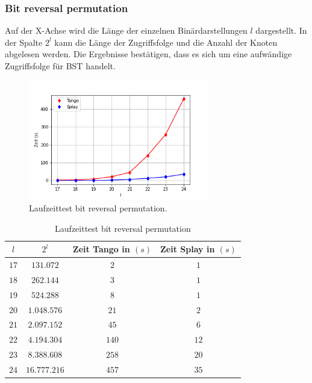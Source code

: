 \documentclass[a4paper,12pt]{article}
\begin{document}
\subsubsection{Bit reversal permutation}
Auf der X-Achse wird die Länge der einzelnen Binärdarstellungen $l$ dargestellt. In der Spalte $2^l$ kann die Länge der Zugriffsfolge und die Anzahl der Knoten abgelesen werden. Die Ergebnisse bestätigen, dass es sich um eine aufwändige Zugriffsfolge für BST handelt.
\begin{figure}[H]
	\centering
	\includegraphics[width=0.7\textwidth]{"Medien/laufzeittest/diagramm/brp"}
	\caption{Laufzeittest bit reversal permutation.}
	\label{fig:ResultGUI}
\end{figure}
\begin{table}[H]
	\begin{center}
		\begin{tabular}[c]{|c|c|c|c|}
			\hline
			$l$ & $2^l$ &Zeit Tango in $\left(s\right)$ &Zeit Splay in $\left(s\right)$ \\
			\hline
			$17$ &	$131.072 $ &$2$ &$1$ \\
			\hline
			$18$  &$262.144 $ &$3$ &$1$  \\
			\hline
			$19$  &$524.288 $ &$8$ &$1$  \\
			\hline
			$20$  &$1.048.576 $ &$21$ &$2$  \\
			\hline
			$21$  &$2.097.152 $ &$45$ &$6$  \\
			\hline
			$22$  &$4.194.304 $ &$140$ &$12$  \\
			\hline
			$23$  &$8.388.608 $ &$258$ &$20$  \\
			\hline
			$24$  &$16.777.216$ &$457$ &$35$  \\
			\hline
		\end{tabular}
		\caption{Laufzeittest bit reversal permutation} 
	\end{center}
\end{table}
\end{document}
